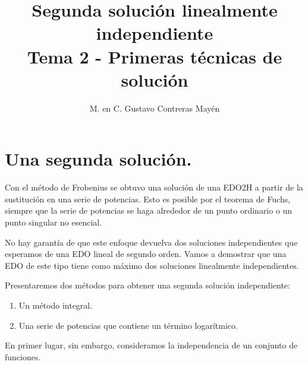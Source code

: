 
\usepackage{apacite}
\title{Segunda solución linealmente independiente \\[0.3em]  \large{Tema 2 - Primeras técnicas de solución}\vspace{-3ex}}
\author{M. en C. Gustavo Contreras Mayén}
\date{ }

\vspace{-4cm}
\maketitle
\fontsize{14}{14}\selectfont
\tableofcontents
\newpage
\section{Una segunda solución.}
Con el método de Frobenius se obtuvo una solución de una EDO2H a partir de la sustitución en una serie de potencias. Esto es posible por el teorema de Fuchs, siempre que la serie de potencias se haga alrededor de un punto ordinario o un punto singular no esencial.
\par
No hay garantía de que este enfoque devuelva dos soluciones independientes que esperamos de una EDO lineal de segundo orden. Vamos a demostrar que una EDO de este tipo tiene como máximo dos soluciones linealmente independientes. 
\par
Presentaremos dos métodos para obtener una segunda solución independiente:
\begin{enumerate}
\item Un método integral.
\item Una serie de potencias que contiene un término logarítmico.
\end{enumerate}
En primer lugar, sin embargo, consideramos la independencia de un conjunto de funciones.
